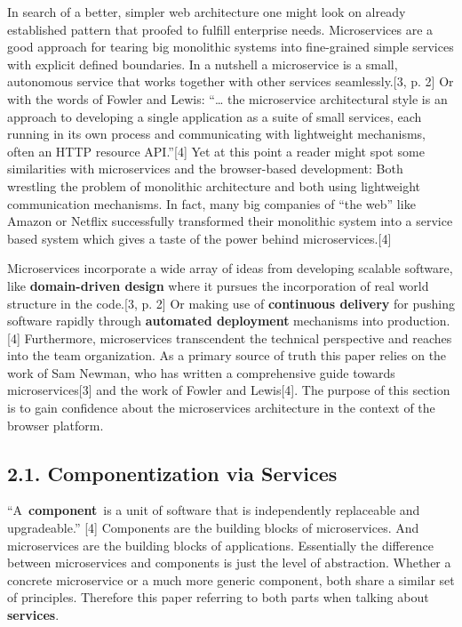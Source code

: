 \documentclass[]{article}
\begin{document}
In search of a better, simpler web architecture one might look on
already established pattern that proofed to fulfill enterprise needs.
Microservices are a good approach for tearing big monolithic systems
into fine-grained simple services with explicit defined boundaries. In a
nutshell a microservice is a small, autonomous service that works
together with other services seamlessly.{[}3, p. 2{]} Or with the words
of Fowler and Lewis: ``\ldots{} the microservice architectural style is
an approach to developing a single application as a suite of small
services, each running in its own process and communicating with
lightweight mechanisms, often an HTTP resource API.''{[}4{]} Yet at this
point a reader might spot some similarities with microservices and the
browser-based development: Both wrestling the problem of monolithic
architecture and both using lightweight communication mechanisms. In
fact, many big companies of ``the web'' like Amazon or Netflix
successfully transformed their monolithic system into a service based
system which gives a taste of the power behind microservices.{[}4{]}

Microservices incorporate a wide array of ideas from developing scalable
software, like \textbf{domain-driven design} where it pursues the
incorporation of real world structure in the code.{[}3, p. 2{]} Or
making use of \textbf{continuous delivery} for pushing software rapidly
through \textbf{automated deployment} mechanisms into production.{[}4{]}
Furthermore, microservices transcendent the technical perspective and
reaches into the team organization. As a primary source of truth this
paper relies on the work of Sam Newman, who has written a comprehensive
guide towards microservices{[}3{]} and the work of Fowler and
Lewis{[}4{]}. The purpose of this section is to gain confidence about
the microservices architecture in the context of the browser platform.

\subsection{2.1. Componentization via
Services}\label{componentization-via-services}

``A~\textbf{component}~is a unit of software that is independently
replaceable and upgradeable.'' {[}4{]} Components are the building
blocks of microservices. And microservices are the building blocks of
applications. Essentially the difference between microservices and
components is just the level of abstraction. Whether a concrete
microservice or a much more generic component, both share a similar set
of principles. Therefore this paper referring to both parts when talking
about \textbf{services}.
\end{document}
